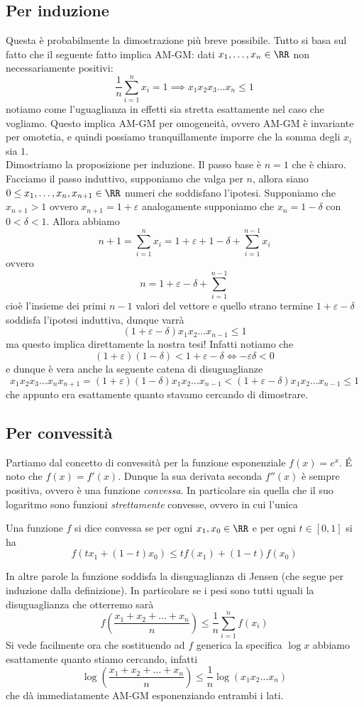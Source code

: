 \documentclass[11pt]{scrartcl}
\begin{document}
  	\subsection{Per induzione}
  	Questa è probabilmente la dimostrazione più breve possibile. Tutto si basa sul fatto che il seguente fatto implica AM-GM: dati $x_1,\dots,x_n\in\RR$ non necessariamente positivi:
  	$$\frac{1}{n}\sum_{i=1}^{n}x_i=1 \implies x_1x_2x_3\dots x_n\le 1$$
  	notiamo come l'uguaglianza in effetti sia stretta esattamente nel caso che vogliamo. Questo implica AM-GM per omogeneità, ovvero AM-GM è invariante per omotetia, e quindi possiamo tranquillamente imporre che la somma degli $x_i$ sia $1$. \\
  	Dimostriamo la proposizione per induzione. Il passo base è $n=1$ che è chiaro. Facciamo il passo induttivo, supponiamo che valga per $n$, allora siano $0\le x_1,\dots,x_n,x_{n+1}\in\RR$ numeri che soddisfano l'ipotesi. Supponiamo che $x_{n+1}>1$ ovvero $x_{n+1}=1+\varepsilon$ analogamente supponiamo che $x_n=1-\delta$ con $0<\delta<1$.
  	Allora abbiamo
  	$$n+1=\sum_{i=1}^n x_i=1+\varepsilon+1-\delta+\sum_{i=1}^{n-1}x_i$$
  	ovvero
  	$$n=1+\varepsilon-\delta+\sum_{i=1}^{n-1}$$
  	cioè l'insieme dei primi $n-1$ valori del vettore e quello strano termine $1+\varepsilon-\delta$ soddisfa l'ipotesi induttiva, dunque varrà
  	$$(1+\varepsilon-\delta)x_1x_2\dots x_{n-1}\le 1$$
  	ma questo implica direttamente la nostra tesi! Infatti notiamo che 
  	$$(1+\varepsilon)(1-\delta)<1+\varepsilon-\delta \iff -\varepsilon\delta<0$$
  	e dunque è vera anche la seguente catena di disuguaglianze
  	$$x_1x_2x_3\dots x_n x_{n+1}=(1+\varepsilon)(1-\delta)x_1x_2\dots x_{n-1}<(1+\varepsilon-\delta)x_1x_2\dots x_{n-1}\le 1$$
  	che appunto era esattamente quanto stavamo cercando di dimostrare.
  	
  	\subsection{Per convessità}
  	Partiamo dal concetto di convessità per la funzione esponenziale $f(x)=e^x$. \'E noto che $f(x)=f'(x)$. Dunque la sua derivata seconda $f''(x)$ è sempre positiva, ovvero è una funzione \textit{convessa}. In particolare sia quella che il suo logaritmo sono funzioni \textit{strettamente} convesse, ovvero in cui l'unica 
  	\begin{definition}[Convessità]
  		Una funzione $f$ si dice convessa se per ogni $x_1,x_0\in\RR$ e per ogni $t\in[0,1]$ si ha 
  		$$f\left(tx_1+(1-t)x_0\right)\le tf(x_1)+(1-t)f(x_0)$$
  	\end{definition}
  	In altre parole la funzione soddisfa la disuguaglianza di Jensen (che segue per induzione dalla definizione). In particolare se i pesi sono tutti uguali la disuguaglianza che otterremo sarà
  	$$f\left(\frac{x_1+x_2+\dots+x_n}{n}\right)\le \frac{1}{n}\sum_{i=1}^n f(x_i)$$
  	Si vede facilmente ora che sostituendo ad $f$ generica la specifica $\log x$ abbiamo esattamente quanto stiamo cercando, infatti
  	$$\log\left(\frac{x_1+x_2+\dots+x_n}{n}\right)\le \frac{1}{n}\log(x_1x_2\dots x_n)$$
  	che dà immediatamente AM-GM esponenziando entrambi i lati.
\end{document}
